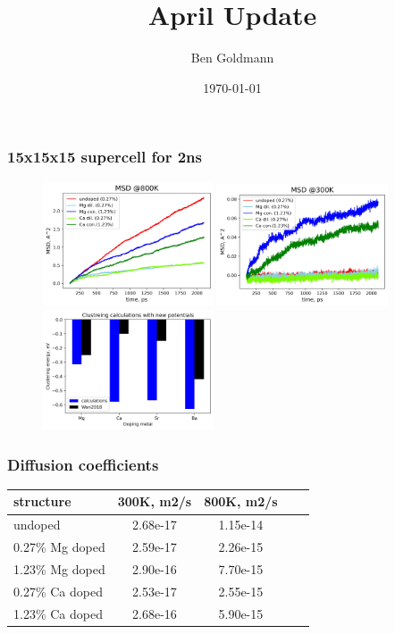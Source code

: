\documentclass{beamer}
\title{April Update}
\author{Ben Goldmann}
\date{\today}
\begin{document}
\begin{frame}
\titlepage
\end{frame}

\begin{frame}
\frametitle{15x15x15 supercell for 2ns}

\begin{figure}
\includegraphics[width=0.45\textwidth]{800k.jpg}
\includegraphics[width=0.45\textwidth]{300k.jpg}
\includegraphics[width=0.45\textwidth]{clustering.jpg}
\end{figure}

\end{frame}

\begin{frame}
\frametitle{Diffusion coefficients}

\begin{table}[h!]
  \begin{center}
    \label{tab:table1}
    \begin{tabular}{l|c|c|c|c}
      \textbf{structure} & \textbf{300K, m2/s} & \textbf{800K, m2/s}\\
      \hline
      undoped & 2.68e-17 & 1.15e-14\\
      0.27\% Mg doped & 2.59e-17 & 2.26e-15\\
      1.23\% Mg doped & 2.90e-16 & 7.70e-15\\
      0.27\% Ca doped & 2.53e-17 & 2.55e-15\\
      1.23\% Ca doped & 2.68e-16 & 5.90e-15\\
    \end{tabular}
  \end{center}
\end{table}

\end{frame}
\end{document}
